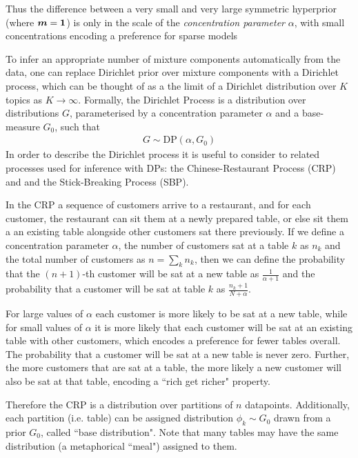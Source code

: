 Thus the difference between a very small and very large symmetric hyperprior (where $\bm m=\bm 1$) is only in the scale of the \emph{concentration parameter} $\alpha$, with small concentrations encoding a preference for sparse models

To infer an appropriate number of mixture components automatically from the data, one can replace Dirichlet prior over mixture components with a Dirichlet process, which can be thought of as a the limit of a Dirichlet distribution over $K$ topics as $K \rightarrow \infty$. Formally, the Dirichlet Process is a distribution over distributions $G$, parameterised by a concentration parameter $\alpha$ and a base-measure $G_0$, such that
\begin{align*}
G \sim \text{DP}\left(\alpha, G_0\right)
\end{align*}
In order to describe the Dirichlet process it is useful to consider to related processes used for inference with DPs: the Chinese-Restaurant Process (CRP) and and the Stick-Breaking Process (SBP).

In the CRP\cite{Neal2000} a sequence of customers arrive to a restaurant, and for each customer, the restaurant can sit them at a newly prepared table, or else sit them a an existing table alongside other customers sat there previously. If we define a concentration parameter $\alpha$, the number of customers sat at a table $k$ as $n_k$ and the total number of customers as $n = \sum_k n_k$, then we can define the probability that the $(n+1)$-th customer will be sat at a new table as $\frac{1}{\alpha + 1}$ and the probability that a customer will be sat at table $k$ as $\frac{n_k + 1}{N + \alpha}$. 

For large values of $\alpha$ each customer is more likely to be sat at a new table, while for small values of $\alpha$ it is more likely that each customer will be sat at an existing table with other customers, which encodes a preference for fewer tables overall. The probability that a customer will be sat at a new table is never zero. Further, the more customers that are sat at a table, the more likely a new customer will also be sat at that table, encoding a ``rich get richer" property.

Therefore the CRP is a distribution over partitions of $n$ datapoints. Additionally, each  partition (i.e. table) can be assigned distribution $\phi_k \sim G_0$ drawn from a prior $G_0$, called ``base distribution". Note that many tables may have the same distribution (a metaphorical ``meal") assigned to them.

